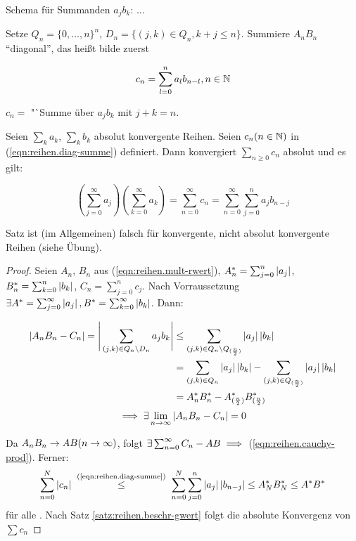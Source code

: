 \documentclass[12pt]{scrreprt}
\begin{document}
Schema für Summanden $a_jb_k$:
...

Setze $Q_n = \{0, \dotsc, n\}^n$, $D_n = \{(j, k) \in Q_n, k+j \le n\}$.
Summiere $A_nB_n$ "`diagonal"', das heißt bilde zuerst

\begin{equation}\label{eqn:reihen.diag-summe}
c_n = \sum_{l=0}^n a_lb_{n-l}, n \in \mathbb{N}
\end{equation}

$c_n = $ "`Summe über $a_jb_k$ mit $j+k = n$.

\begin{satz}\label{satz:reihen.cauchy-prod}
Seien $\sum_k a_k$, $\sum_k b_k$ absolut konvergente Reihen. Seien $c_n (n\in\mathbb{N})$ in (\ref{eqn:reihen.diag-summe}) definiert.
Dann konvergiert $\sum_{n\ge0} c_n$ absolut und es gilt:

\begin{equation}\label{eqn:reihen.cauchy-prod}
\left(\sum_{j=0}^\infty a_j\right)\left(\sum_{k=0}^\infty a_k\right) = \sum_{n=0}^\infty c_n = \sum_{n=0}^\infty \sum_{j=0}^n a_jb_{n-j}
\end{equation}
\end{satz}

\begin{bem*}
Satz ist (im Allgemeinen) falsch für konvergente, nicht absolut konvergente Reihen (siehe Übung).
\end{bem*}

\begin{proof}
Seien $A_n$, $B_n$ aus (\ref{eqn:reihen.mult-rwert}), $A_n^* = \sum_{j=0}^n \left\lvert a_j\right\lvert$, $B_n^* = \sum_{k=0}^n \left\lvert b_k\right\lvert$,
$C_n = \sum_{j=0}^n c_j$. Nach Vorraussetzung $\exists A^* = \sum_{j=0}^\infty \left\lvert a_j\right\lvert, B^* = \sum_{k=0}^\infty \left\lvert b_k\right\lvert$.
Dann:

\begin{align*}
\left\lvert A_nB_n - C_n\right\lvert = \Bigg\lvert\sum_{(j,k)\in Q_n\backslash D_n} a_jb_k\Bigg\lvert &\le 
	\sum_{(j,k)\in Q_n\backslash Q_{(\frac{n}{2})}} \left\lvert a_j\right\lvert\left\lvert b_k\right\lvert \\
	&= \sum_{(j,k)\in Q_n} \left\lvert a_j\right\lvert\left\lvert b_k\right\lvert - \sum_{(j,k)\in Q_{(\frac{n}{2})}} \left\lvert a_j\right\lvert\left\lvert b_k\right\lvert\\
	&= A_n^*B_n^* - A_{(\frac{n}{2})}^*B_{(\frac{n}{2})}^*
\end{align*}
\[\implies \exists\lim_{n\rightarrow\infty} \left\lvert A_nB_n - C_n\right\lvert = 0\]

Da $A_nB_n \rightarrow AB (n\rightarrow\infty)$, folgt $\exists\sum_{n=0}^\infty C_n - AB \implies$ (\ref{eqn:reihen.cauchy-prod}).
Ferner: \[\sum_{n=0}^N \abs{c_n} \nach{\le}{(\ref{eqn:reihen.diag-summe})}
\sum_{n=0}^N\sum_{j=0}^n \abs{a_j}\abs{b_{n-j}} \le %
A_N^*B_N^* \le A^*B^*\] für alle . Nach Satz \ref{satz:reihen.beschr-gwert} folgt die absolute Konvergenz von $\sum c_n$
\end{proof}
\end{document}
